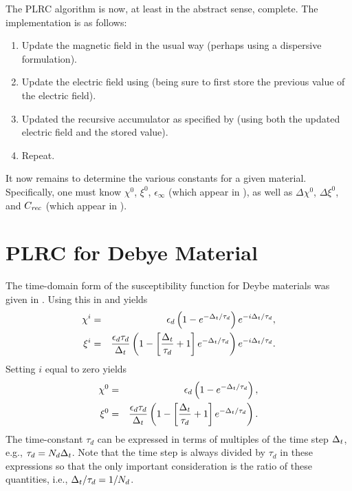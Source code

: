 The PLRC algorithm is now, at least in the abstract sense, complete.
The implementation is as follows:
\begin{enumerate}
\item Update the magnetic field in the usual way (perhaps using a
dispersive formulation).  
\item Update the electric field using  (being
sure to first store the previous value of the electric field).
\item Updated the recursive accumulator as specified by
 (using both the updated electric field and the
stored value).
\item Repeat.
\end{enumerate}
It now remains to determine the various constants for a given
material.  Specifically, one must know $\chi^0$, $\xi^0$,
$\epsilon_\infty$ (which appear in ), as well as
$\Delta\chi^0$, $\Delta\xi^0$, and $C_{\mathit{rec}}$ (which appear in
).

\section{PLRC for Debye Material}

The time-domain form of the susceptibility function for Deybe
materials was given in .  Using this in
 and  yields
\begin{eqnarray}
  \chi^i &=& \epsilon_d\left(1-e^{-\Delta_t/\tau_d}\right)e^{-i\Delta_t/\tau_d},
  \label{eq:plrcChiDebye} \\
  \xi^i &=& \frac{\epsilon_d\tau_d}{\Delta_t}
            \left(1-\left[\frac{\Delta_t}{\tau_d}+1\right]
                  e^{-\Delta_t/\tau_d}\right)e^{-i\Delta_t/\tau_d}.
  \label{eq:plrcXiDebye}
\end{eqnarray}
Setting $i$ equal to zero yields
\begin{eqnarray}
  \chi^0 &=& \epsilon_d\left(1-e^{-\Delta_t/\tau_d}\right), \\
  \xi^0 &=& \frac{\epsilon_d\tau_d}{\Delta_t}
            \left(1-\left[\frac{\Delta_t}{\tau_d}+1\right]
                  e^{-\Delta_t/\tau_d}\right).
\end{eqnarray}
The time-constant $\tau_d$ can be expressed in terms of multiples of
the time step $\Delta_t$, e.g., $\tau_d=N_d\Delta_t$.  Note that the time
step is 
always divided by $\tau_d$ in these expressions so that the only important
consideration is the ratio of these quantities, i.e., $\Delta_t/\tau_d = 1/N_d$.

